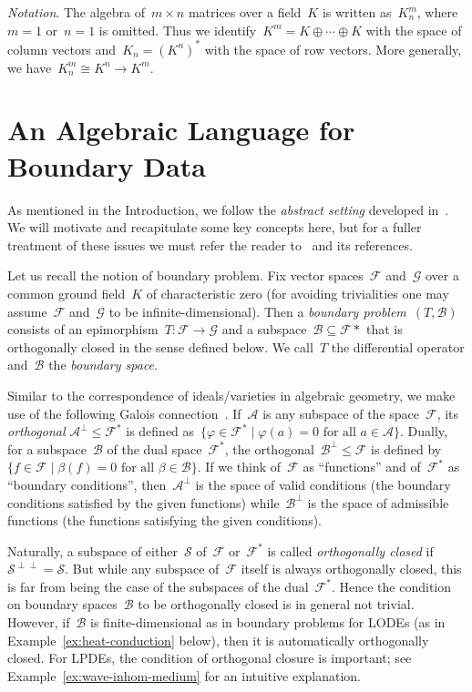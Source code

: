 \documentclass[a4paper]{llncs}
\let\phi\varphi
\newcommand{\orth}[1]{#1^\perp}
\newcommand{\biorth}[1]{#1^{\perp\perp}}
\newcommand{\mat}[3]{#1^{#2}_{#3}}
\newcommand{\galg}{\mathcal{F}}
\newcommand{\ogalg}{\mathcal{G}}
\newcommand{\bspc}{\mathcal{B}}
\begin{document}
\emph{Notation}. The algebra of~$m \times n$ matrices over a field~$K$ is
written as~$\mat{K}{m}{n}$, where~$m=1$ or~$n=1$ is omitted. Thus we
identify~$K^m = K \oplus \cdots \oplus K$ with the space of column vectors
and~$K_n = (K^n)^*$ with the space of row vectors. More generally, we
have~$\mat{K}{m}{n} \cong K^n \to K^m$.


\section{An Algebraic Language for Boundary Data}
\label{sec:boundary-data}


As mentioned in the Introduction, we follow the \emph{abstract setting}
developed in~\cite{RegensburgerRosenkranz2009}. We will motivate and
recapitulate some key concepts here, but for a fuller treatment of these issues
we must refer the reader to~\cite{RegensburgerRosenkranz2009} and its references.

Let us recall the notion of boundary problem. Fix vector
spaces~$\galg$ and~$\ogalg$ over a common ground field~$K$
of characteristic zero (for avoiding trivialities one may
assume~$\galg$ and~$\ogalg$ to be
infinite-dimensional). Then a \emph{boundary problem}~$(T, \bspc)$
consists of an epimorphism~$T\colon \galg \to \ogalg$ and a
subspace~$\bspc \subseteq \galg*$ that is orthogonally closed in
the sense defined below. We call~$T$ the differential operator
and~$\mathcal{B}$ the \emph{boundary space}.

Similar to the correspondence of ideals/varieties in algebraic geometry, we make
use of the following Galois
connection~\cite[A.11]{RegensburgerRosenkranz2009}. If~$\mathcal{A}$ is any
subspace of the space~$\galg$, its \emph{orthogonal} $\orth{\mathcal{A}} \le
\galg^*$ is defined as~$\{ \phi \in \galg^* \mid \phi(a) = 0 \text{ for all $a
  \in \mathcal{A}$} \}$. Dually, for a subspace~$\mathcal{B}$ of the dual
space~$\galg^*$, the orthogonal~$\orth{\mathcal{B}} \le \galg$ is defined by~$\{
f \in \galg \mid \beta(f) = 0 \text{ for all $\beta \in \mathcal{B}$} \}$. If we
think of~$\galg$ as ``functions'' and of~$\galg^*$ as ``boundary conditions'',
then~$\orth{\mathcal{A}}$ is the space of valid conditions (the boundary
conditions satisfied by the given functions) while~$\orth{\mathcal{B}}$ is the
space of admissible functions (the functions satisfying the given conditions).

Naturally, a subspace of either~$\mathcal{S}$ of~$\galg$ or~$\galg^*$ is called
\emph{orthogonally closed} if $\biorth{\mathcal{S}} = \mathcal{S}$. But while
any subspace of~$\galg$ itself is always orthogonally closed, this is far from
being the case of the subspaces of the dual~$\galg^*$. Hence the condition on
boundary spaces~$\mathcal{B}$ to be orthogonally closed is in general not
trivial. However, if~$\mathcal{B}$ is finite-dimensional as in boundary problems
for LODEs (as in Example~\ref{ex:heat-conduction} below), then it is
automatically orthogonally closed. For LPDEs, the condition of orthogonal
closure is important; see Example~\ref{ex:wave-inhom-medium} for an intuitive
explanation.
\end{document}
